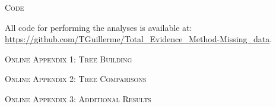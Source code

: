 \documentclass[12pt,letterpaper]{article}
\renewcommand{\section}[1]{%
\bigskip
\begin{center}
\begin{Large}
\normalfont\scshape #1
\medskip
\end{Large}
\end{center}}
\begin{document}
\section{Code}
All code for performing the analyses is available at: \url{https://github.com/TGuillerme/Total_Evidence_Method-Missing_data}.

\newpage
\section{Online Appendix 1: Tree Building}
  
  \label{Supp_TreeBuilding}

\newpage
\section{Online Appendix 2: Tree Comparisons}
  
  \label{Supp_TreeComparison}




\newpage
\section{Online Appendix 3: Additional Results}
  
  \label{Supp_results}

\end{document}
